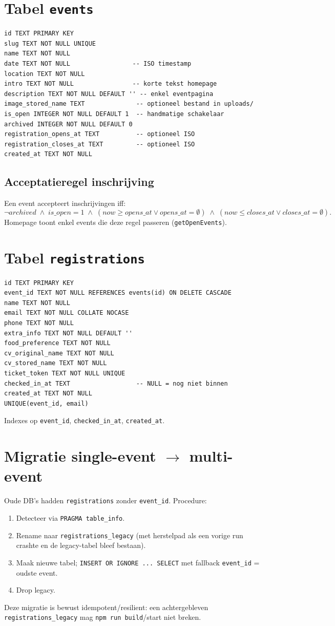 \documentclass[11pt,a4paper]{report}
\begin{document}
\section{Tabel \texttt{events}}
\begin{lstlisting}
id TEXT PRIMARY KEY
slug TEXT NOT NULL UNIQUE
name TEXT NOT NULL
date TEXT NOT NULL                 -- ISO timestamp
location TEXT NOT NULL
intro TEXT NOT NULL                -- korte tekst homepage
description TEXT NOT NULL DEFAULT '' -- enkel eventpagina
image_stored_name TEXT              -- optioneel bestand in uploads/
is_open INTEGER NOT NULL DEFAULT 1  -- handmatige schakelaar
archived INTEGER NOT NULL DEFAULT 0
registration_opens_at TEXT          -- optioneel ISO
registration_closes_at TEXT         -- optioneel ISO
created_at TEXT NOT NULL
\end{lstlisting}

\subsection{Acceptatieregel inschrijving}
Een event accepteert inschrijvingen iff:
\[
\neg archived \;\wedge\; is\_open=1 \;\wedge\;
(now \ge opens\_at \lor opens\_at=\emptyset) \;\wedge\;
(now \le closes\_at \lor closes\_at=\emptyset).
\]
Homepage toont enkel events die deze regel passeren (\texttt{getOpenEvents}).

\section{Tabel \texttt{registrations}}
\begin{lstlisting}
id TEXT PRIMARY KEY
event_id TEXT NOT NULL REFERENCES events(id) ON DELETE CASCADE
name TEXT NOT NULL
email TEXT NOT NULL COLLATE NOCASE
phone TEXT NOT NULL
extra_info TEXT NOT NULL DEFAULT ''
food_preference TEXT NOT NULL
cv_original_name TEXT NOT NULL
cv_stored_name TEXT NOT NULL
ticket_token TEXT NOT NULL UNIQUE
checked_in_at TEXT                  -- NULL = nog niet binnen
created_at TEXT NOT NULL
UNIQUE(event_id, email)
\end{lstlisting}
Indexes op \texttt{event\_id}, \texttt{checked\_in\_at}, \texttt{created\_at}.

\section{Migratie single-event $\to$ multi-event}
Oude DB's hadden \texttt{registrations} zonder \texttt{event\_id}.
Procedure:
\begin{enumerate}[leftmargin=*]
  \item Detecteer via \texttt{PRAGMA table\_info}.
  \item Rename naar \texttt{registrations\_legacy} (met herstelpad als een vorige run crashte en de legacy-tabel bleef bestaan).
  \item Maak nieuwe tabel; \texttt{INSERT OR IGNORE ... SELECT} met fallback \texttt{event\_id} = oudste event.
  \item Drop legacy.
\end{enumerate}
Deze migratie is bewust idempotent/resilient: een achtergebleven
\texttt{registrations\_legacy} mag \texttt{npm run build}/start niet breken.
\end{document}
